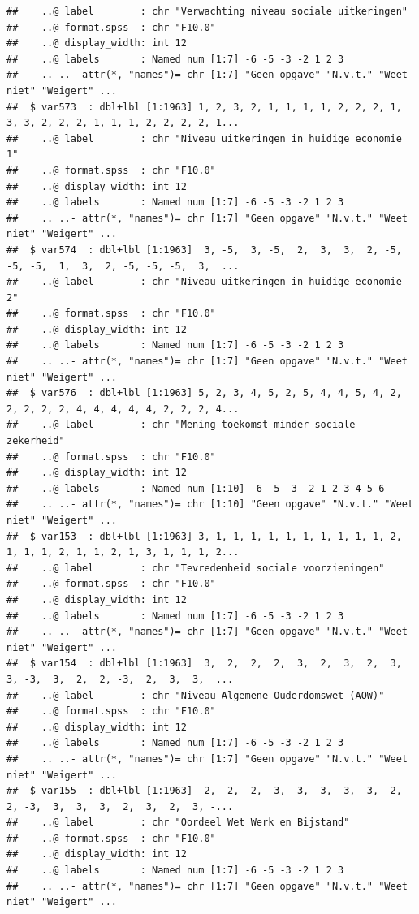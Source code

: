 \documentclass[
]{book}
\begin{document}
\begin{verbatim}
##    ..@ label        : chr "Verwachting niveau sociale uitkeringen"
##    ..@ format.spss  : chr "F10.0"
##    ..@ display_width: int 12
##    ..@ labels       : Named num [1:7] -6 -5 -3 -2 1 2 3
##    .. ..- attr(*, "names")= chr [1:7] "Geen opgave" "N.v.t." "Weet niet" "Weigert" ...
##  $ var573  : dbl+lbl [1:1963] 1, 2, 3, 2, 1, 1, 1, 1, 2, 2, 2, 1, 3, 3, 2, 2, 2, 1, 1, 1, 2, 2, 2, 2, 1...
##    ..@ label        : chr "Niveau uitkeringen in huidige economie 1"
##    ..@ format.spss  : chr "F10.0"
##    ..@ display_width: int 12
##    ..@ labels       : Named num [1:7] -6 -5 -3 -2 1 2 3
##    .. ..- attr(*, "names")= chr [1:7] "Geen opgave" "N.v.t." "Weet niet" "Weigert" ...
##  $ var574  : dbl+lbl [1:1963]  3, -5,  3, -5,  2,  3,  3,  2, -5, -5, -5,  1,  3,  2, -5, -5, -5,  3,  ...
##    ..@ label        : chr "Niveau uitkeringen in huidige economie 2"
##    ..@ format.spss  : chr "F10.0"
##    ..@ display_width: int 12
##    ..@ labels       : Named num [1:7] -6 -5 -3 -2 1 2 3
##    .. ..- attr(*, "names")= chr [1:7] "Geen opgave" "N.v.t." "Weet niet" "Weigert" ...
##  $ var576  : dbl+lbl [1:1963] 5, 2, 3, 4, 5, 2, 5, 4, 4, 5, 4, 2, 2, 2, 2, 2, 4, 4, 4, 4, 4, 2, 2, 2, 4...
##    ..@ label        : chr "Mening toekomst minder sociale zekerheid"
##    ..@ format.spss  : chr "F10.0"
##    ..@ display_width: int 12
##    ..@ labels       : Named num [1:10] -6 -5 -3 -2 1 2 3 4 5 6
##    .. ..- attr(*, "names")= chr [1:10] "Geen opgave" "N.v.t." "Weet niet" "Weigert" ...
##  $ var153  : dbl+lbl [1:1963] 3, 1, 1, 1, 1, 1, 1, 1, 1, 1, 1, 2, 1, 1, 1, 2, 1, 1, 2, 1, 3, 1, 1, 1, 2...
##    ..@ label        : chr "Tevredenheid sociale voorzieningen"
##    ..@ format.spss  : chr "F10.0"
##    ..@ display_width: int 12
##    ..@ labels       : Named num [1:7] -6 -5 -3 -2 1 2 3
##    .. ..- attr(*, "names")= chr [1:7] "Geen opgave" "N.v.t." "Weet niet" "Weigert" ...
##  $ var154  : dbl+lbl [1:1963]  3,  2,  2,  2,  3,  2,  3,  2,  3,  3, -3,  3,  2,  2, -3,  2,  3,  3,  ...
##    ..@ label        : chr "Niveau Algemene Ouderdomswet (AOW)"
##    ..@ format.spss  : chr "F10.0"
##    ..@ display_width: int 12
##    ..@ labels       : Named num [1:7] -6 -5 -3 -2 1 2 3
##    .. ..- attr(*, "names")= chr [1:7] "Geen opgave" "N.v.t." "Weet niet" "Weigert" ...
##  $ var155  : dbl+lbl [1:1963]  2,  2,  2,  3,  3,  3,  3, -3,  2,  2, -3,  3,  3,  3,  2,  3,  2,  3, -...
##    ..@ label        : chr "Oordeel Wet Werk en Bijstand"
##    ..@ format.spss  : chr "F10.0"
##    ..@ display_width: int 12
##    ..@ labels       : Named num [1:7] -6 -5 -3 -2 1 2 3
##    .. ..- attr(*, "names")= chr [1:7] "Geen opgave" "N.v.t." "Weet niet" "Weigert" ...

\end{verbatim}
\end{document}

